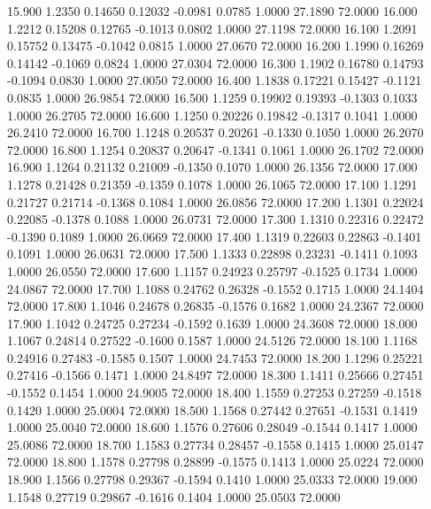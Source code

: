   15.900   1.2350   0.14650   0.12032  -0.0981   0.0785   1.0000  27.1890  72.0000
  16.000   1.2212   0.15208   0.12765  -0.1013   0.0802   1.0000  27.1198  72.0000
  16.100   1.2091   0.15752   0.13475  -0.1042   0.0815   1.0000  27.0670  72.0000
  16.200   1.1990   0.16269   0.14142  -0.1069   0.0824   1.0000  27.0304  72.0000
  16.300   1.1902   0.16780   0.14793  -0.1094   0.0830   1.0000  27.0050  72.0000
  16.400   1.1838   0.17221   0.15427  -0.1121   0.0835   1.0000  26.9854  72.0000
  16.500   1.1259   0.19902   0.19393  -0.1303   0.1033   1.0000  26.2705  72.0000
  16.600   1.1250   0.20226   0.19842  -0.1317   0.1041   1.0000  26.2410  72.0000
  16.700   1.1248   0.20537   0.20261  -0.1330   0.1050   1.0000  26.2070  72.0000
  16.800   1.1254   0.20837   0.20647  -0.1341   0.1061   1.0000  26.1702  72.0000
  16.900   1.1264   0.21132   0.21009  -0.1350   0.1070   1.0000  26.1356  72.0000
  17.000   1.1278   0.21428   0.21359  -0.1359   0.1078   1.0000  26.1065  72.0000
  17.100   1.1291   0.21727   0.21714  -0.1368   0.1084   1.0000  26.0856  72.0000
  17.200   1.1301   0.22024   0.22085  -0.1378   0.1088   1.0000  26.0731  72.0000
  17.300   1.1310   0.22316   0.22472  -0.1390   0.1089   1.0000  26.0669  72.0000
  17.400   1.1319   0.22603   0.22863  -0.1401   0.1091   1.0000  26.0631  72.0000
  17.500   1.1333   0.22898   0.23231  -0.1411   0.1093   1.0000  26.0550  72.0000
  17.600   1.1157   0.24923   0.25797  -0.1525   0.1734   1.0000  24.0867  72.0000
  17.700   1.1088   0.24762   0.26328  -0.1552   0.1715   1.0000  24.1404  72.0000
  17.800   1.1046   0.24678   0.26835  -0.1576   0.1682   1.0000  24.2367  72.0000
  17.900   1.1042   0.24725   0.27234  -0.1592   0.1639   1.0000  24.3608  72.0000
  18.000   1.1067   0.24814   0.27522  -0.1600   0.1587   1.0000  24.5126  72.0000
  18.100   1.1168   0.24916   0.27483  -0.1585   0.1507   1.0000  24.7453  72.0000
  18.200   1.1296   0.25221   0.27416  -0.1566   0.1471   1.0000  24.8497  72.0000
  18.300   1.1411   0.25666   0.27451  -0.1552   0.1454   1.0000  24.9005  72.0000
  18.400   1.1559   0.27253   0.27259  -0.1518   0.1420   1.0000  25.0004  72.0000
  18.500   1.1568   0.27442   0.27651  -0.1531   0.1419   1.0000  25.0040  72.0000
  18.600   1.1576   0.27606   0.28049  -0.1544   0.1417   1.0000  25.0086  72.0000
  18.700   1.1583   0.27734   0.28457  -0.1558   0.1415   1.0000  25.0147  72.0000
  18.800   1.1578   0.27798   0.28899  -0.1575   0.1413   1.0000  25.0224  72.0000
  18.900   1.1566   0.27798   0.29367  -0.1594   0.1410   1.0000  25.0333  72.0000
  19.000   1.1548   0.27719   0.29867  -0.1616   0.1404   1.0000  25.0503  72.0000
